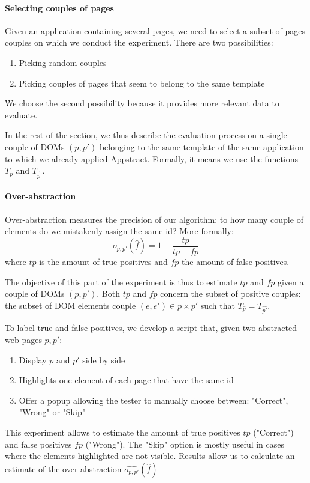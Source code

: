 \paragraph{Selecting couples of pages}
Given an application containing several pages, we need to select a subset of pages couples on which we conduct the experiment.
There are two possibilities:
\begin{enumerate}
    \item Picking random couples
    \item Picking couples of pages that seem to belong to the same template
\end{enumerate}
We choose the second possibility because it provides more relevant data to evaluate.

In the rest of the section, we thus describe the evaluation process on a single couple of DOMs $(p, p')$ belonging to the same template of the same application to which we already applied Appstract. 
Formally, it means we use the functions $T_{\hat{p}}$ and $T_{\hat{p'}}$.

\paragraph{Over-abstraction}
Over-abstraction measures the precision of our algorithm: to how many couple of elements do we mistakenly assign the same id?
More formally:
\begin{equation}
o_{p, p'}(\hat{f}) = 1 - \frac{tp}{tp + fp}
\end{equation}
where $tp$ is the amount of true positives and $fp$ the amount of false positives.

The objective of this part of the experiment is thus to estimate $tp$ and $fp$ given a couple of DOMs $(p, p')$.
Both $tp$ and $fp$ concern the subset of positive couples: the subset of DOM elements couple $(e, e') \in p \times p'$ such that $T_{\hat{p}} = T_{\hat{p'}}$.

To label true and false positives, we develop a script that, given two abstracted web pages $p, p'$:
\begin{enumerate}
\item Display $p$ and $p'$ side by side
\item Highlights one element of each page that have the same id
\item Offer a popup allowing the tester to manually choose between: "Correct", "Wrong" or "Skip"
\end{enumerate}

This experiment allows to estimate the amount of true positives $tp$ ("Correct") and false positives $fp$ ("Wrong").
The "Skip" option is mostly useful in cases where the elements highlighted are not visible.
Results allow us to calculate an estimate of the over-abstraction $\hat{o_{p, p'}}(\hat{f})$

